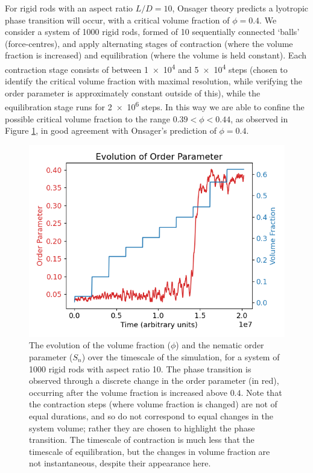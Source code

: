 \documentclass[11pt, a4paper]{article} %
\begin{document}
For rigid rods with an aspect ratio $L/D = 10$, Onsager theory predicts a lyotropic phase transition will occur, with a critical volume fraction of $\phi  = 0.4$. We consider a system of \num{1000} rigid rods, formed of \num{10} sequentially connected `balls' (force-centres), and apply alternating stages of contraction (where the volume fraction is increased) and equilibration (where the volume is held constant). Each contraction stage consists of between \num{1e4} and \num{5e4} steps (chosen to identify the critical volume fraction with maximal resolution, while verifying the order parameter is approximately constant outside of this), while the equilibration stage runs for \num{2e6} steps. In this way we are able to confine the possible critical volume fraction to the range $0.39 < \phi< 0.44$, as observed in Figure \ref{fig:rr_nemorderparam}, in good agreement with Onsager's prediction of $\phi = 0.4$.

\begin{figure} [h!]
	\centering
	\includegraphics[width=0.7\linewidth]{Figures/rigidrod_nemorderparam}
	\caption{The evolution of the volume fraction ($\phi$) and the nematic order parameter ($S_{n}$) over the timescale of the simulation, for a system of 1000 rigid rods with aspect ratio 10. The phase transition is observed through a discrete change in the order parameter (in red), occurring after the volume fraction is increased above $0.4$. Note that the contraction steps (where volume fraction is changed) are not of equal durations, and so do not correspond to equal changes in the system volume; rather they are chosen to highlight the phase transition. The timescale of contraction is much less that the timescale of equilibration, but the changes in volume fraction are not instantaneous, despite their appearance here.}
	\label{fig:rr_nemorderparam}
\end{figure}  %
\end{document}
